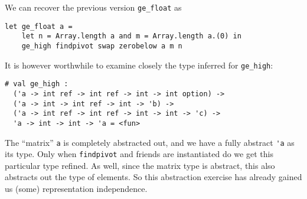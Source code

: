 \documentclass[11pt]{elsart}
\begin{document}
We can recover the previous version \texttt{ge\_float} as
\begin{small}
\begin{verbatim}
let ge_float a = 
    let n = Array.length a and m = Array.length a.(0) in
    ge_high findpivot swap zerobelow a m n
\end{verbatim}
\end{small}

It is however worthwhile to examine closely the type inferred
for \texttt{ge\_high}:
\begin{small}
\begin{verbatim}
# val ge_high : 
  ('a -> int ref -> int ref -> int -> int option) ->
  ('a -> int -> int ref -> int -> 'b) ->
  ('a -> int ref -> int ref -> int -> int -> 'c) -> 
  'a -> int -> int -> 'a = <fun>
\end{verbatim}
\end{small}
\noindent The ``matrix'' \texttt{a} is completely abstracted
out, and we have a fully abstract \verb+'a+ as its type.  Only
when \texttt{findpivot} and friends are instantiated do we get 
this particular type refined.  As well, since the matrix type is
abstract, this also abstracts out the type of elements.
So this abstraction exercise has
already gained us (some) representation independence.
\end{document}
